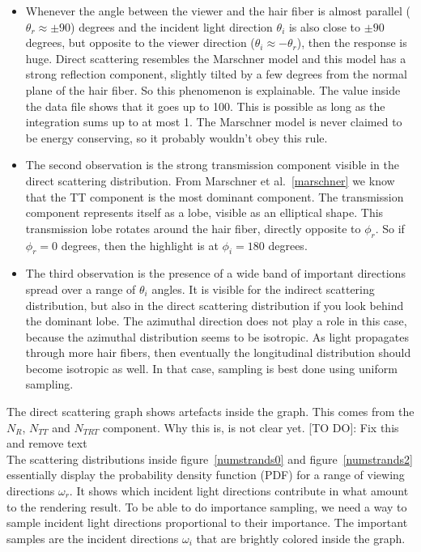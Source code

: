\documentclass[11pt,a4paper]{report}
\begin{document}
\begin{itemize}
\item Whenever the angle between the viewer and the hair fiber is almost parallel ($\theta_r \approx \pm 90$) degrees and the incident light direction $\theta_i$ is also close to $\pm 90$ degrees, but opposite to the viewer direction ($\theta_i \approx -\theta_r$), then the response is huge. Direct scattering resembles the Marschner model and this model has a strong reflection component, slightly tilted by a few degrees from the normal plane of the hair fiber. So this phenomenon is explainable. The value inside the data file shows that it goes up to 100. This is possible as long as the integration sums up to at most 1. The Marschner model is never claimed to be energy conserving, so it probably wouldn't obey this rule.

\item The second observation is the strong transmission component visible in the direct scattering distribution. From Marschner et al.~\ref{marschner} we know that the TT component is the most dominant component. The transmission component represents itself as a lobe, visible as an elliptical shape. This transmission lobe rotates around the hair fiber, directly opposite to $\phi_r$. So if $\phi_r = 0$ degrees, then the highlight is at $\phi_i = 180$ degrees. 

\item The third observation is the presence of a wide band of important directions spread over a range of $\theta_i$ angles. It is visible for the indirect scattering distribution, but also in the direct scattering distribution if you look behind the dominant lobe. The azimuthal direction does not play a role in this case, because the azimuthal distribution seems to be isotropic. As light propagates through more hair fibers, then eventually the longitudinal distribution should become isotropic as well. In that case, sampling is best done using uniform sampling.
\end{itemize}

The direct scattering graph shows artefacts inside the graph. This comes from the $N_R$, $N_{TT}$ and $N_{TRT}$ component. Why this is, is not clear yet.
[TO DO]: Fix this and remove text\\
 
The scattering distributions inside figure~\ref{numstrands0} and figure~\ref{numstrands2} essentially display the probability density function (PDF) for a range of viewing directions $\omega_r$. It shows which incident light directions contribute in what amount to the rendering result. To be able to do importance sampling, we need a way to sample incident light directions proportional to their importance. The important samples are the incident directions $\omega_i$ that are brightly colored inside the graph.
\end{document}
